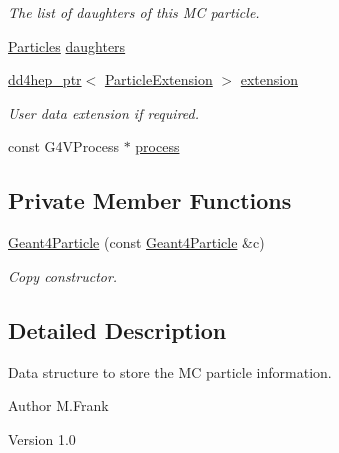 \begin{DoxyCompactItemize}
\begin{DoxyCompactList}\small\item\em The list of daughters of this MC particle. \item\end{DoxyCompactList}\item 
\hyperlink{class_d_d4hep_1_1_simulation_1_1_geant4_particle_a123ad778eff51ea80ce778d54776c072}{Particles} \hyperlink{class_d_d4hep_1_1_simulation_1_1_geant4_particle_a2d11cd13a703d52fa61142af97e243cb}{daughters}
\item 
\hyperlink{class_d_d4hep_1_1dd4hep__ptr}{dd4hep\_\-ptr}$<$ \hyperlink{class_d_d4hep_1_1_simulation_1_1_particle_extension}{ParticleExtension} $>$ \hyperlink{class_d_d4hep_1_1_simulation_1_1_geant4_particle_a07c7467088b330c17ad7f85374273470}{extension}
\begin{DoxyCompactList}\small\item\em User data extension if required. \item\end{DoxyCompactList}\item 
const G4VProcess $\ast$ \hyperlink{class_d_d4hep_1_1_simulation_1_1_geant4_particle_abe2efb370153a1466b9fa5dd61a04f9a}{process}
\end{DoxyCompactItemize}
\subsection*{Private Member Functions}
\begin{DoxyCompactItemize}
\item 
\hyperlink{class_d_d4hep_1_1_simulation_1_1_geant4_particle_a4026f75168da7d38053d87a218bcada5}{Geant4Particle} (const \hyperlink{class_d_d4hep_1_1_simulation_1_1_geant4_particle}{Geant4Particle} \&c)
\begin{DoxyCompactList}\small\item\em Copy constructor. \item\end{DoxyCompactList}\end{DoxyCompactItemize}


\subsection{Detailed Description}
Data structure to store the MC particle information. \begin{DoxyAuthor}{Author}
M.Frank 
\end{DoxyAuthor}
\begin{DoxyVersion}{Version}
1.0 
\end{DoxyVersion}


